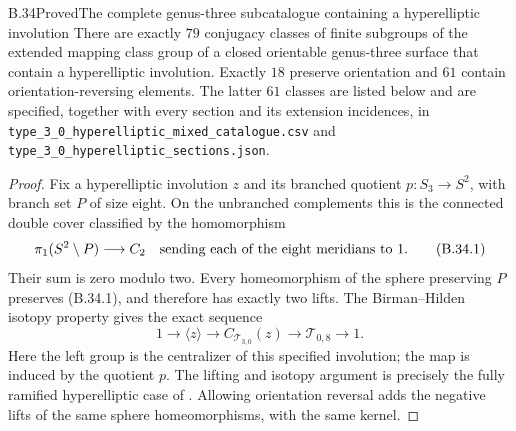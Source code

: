 \begin{claim}{B.34}{Proved}{The complete genus-three subcatalogue containing a hyperelliptic involution}
There are exactly $79$ conjugacy classes of finite subgroups of the
extended mapping class group of a closed orientable genus-three surface
that contain a hyperelliptic involution.  Exactly $18$ preserve orientation
and $61$ contain orientation-reversing elements.  The latter $61$ classes
are listed below and are specified, together with every section and its
extension incidences, in
\texttt{type\_3\_0\_hyperelliptic\_mixed\_catalogue.csv} and
\texttt{type\_3\_0\_hyperelliptic\_sections.json}.
\end{claim}
\begin{proof}
Fix a hyperelliptic involution $z$ and its branched quotient
$p:S_3\longrightarrow S^2$, with branch set $P$ of size eight.
On the unbranched complements this is the connected double cover
classified by the homomorphism
\[
 \pi_1(S^2\setminus P)\longrightarrow C_2
 \quad\hbox{sending each of the eight meridians to }1.
                                                        \tag{B.34.1}
\]
Their sum is zero modulo two.  Every homeomorphism of the sphere
preserving $P$ preserves (B.34.1), and therefore has exactly two lifts.
The Birman--Hilden isotopy property gives the exact sequence
\[
 1\longrightarrow\langle z\rangle\longrightarrow
 C_{\mathcal T_{3,0}}(z)\longrightarrow\mathcal T_{0,8}
 \longrightarrow1.                                    \tag{B.34.2}
\]
Here the left group is the centralizer of this specified involution;
the map is induced by the quotient $p$.  The lifting and isotopy argument
is precisely the fully ramified hyperelliptic case of
\cite[\S9.4]{bFarbMargalit2012}.  Allowing orientation reversal adds the
negative lifts of the same sphere homeomorphisms, with the same kernel.


\end{proof}
